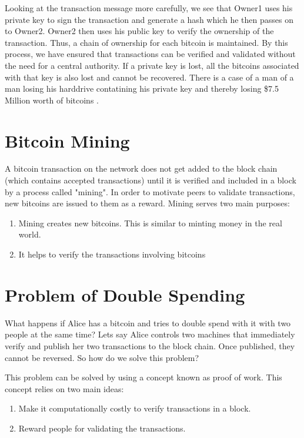 Looking at the transaction message more carefully, we see that Owner1 uses his private key to sign the transaction and generate a hash which he then passes on to Owner2. Owner2 then uses his public key to verify the ownership of the transaction. Thus, a chain of ownership for each bitcoin is maintained. By this process, we have ensured that transactions can be verified and validated without the need for a central authority. If a private key is lost, all the bitcoins associated with that key is also lost and cannot be recovered. There is a case of a man of a man losing his harddrive contatining his private key and thereby losing \$7.5 Million worth of bitcoins \cite{throw}. 

\section{Bitcoin Mining}
A bitcoin transaction on the network does not get added to the block chain (which contains accepted transactions) until it is verified and included in a block by a process called "mining". In order to motivate peers to validate transactions, new bitcoins are issued to them as a reward. Mining serves two main purposes:

\begin{enumerate}
\item Mining creates new bitcoins. This is similar to minting money in the real world.
\item It helps to verify the transactions involving bitcoins
\end{enumerate}

\section{Problem of Double Spending}
What happens if Alice has a bitcoin and tries to double spend with it with two people at the same time? Lets say Alice controls two machines that immediately verify and publish her two transactions to the block chain. Once published, they cannot be reversed. So how do we solve this problem?

This problem can be solved by using a concept known as proof of work. This concept relies on two main ideas:
\begin{enumerate}
\item Make it computationally costly to verify transactions in a block.
\item Reward people for validating the transactions.
\end{enumerate}

